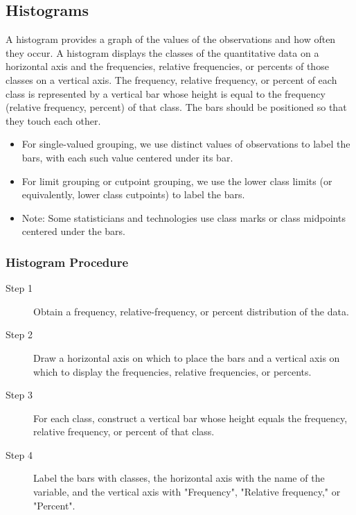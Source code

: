 \documentclass[12pt]{article}
\begin{document}
        \subsection*{Histograms}
            A histogram provides a graph of the values of the observations and how often
            they occur. A histogram displays the classes of the quantitative data on a
            horizontal axis and the frequencies, relative frequencies, or percents of those
            classes on a vertical axis. The frequency, relative frequency, or percent of 
            each class is represented by a vertical bar whose height is equal to the 
            frequency (relative frequency, percent) of that class. The bars should be
            positioned so that they touch each other.
            \begin{itemize}
                \item For single-valued grouping, we use distinct values of observations
                to label the bars, with each such value centered under its bar.
                \item For limit grouping or cutpoint grouping, we use the lower class
                limits (or equivalently, lower class cutpoints) to label the bars. 
                \item Note: Some statisticians and technologies use class marks or class
                midpoints centered under the bars.
            \end{itemize}
            \subsubsection*{Histogram Procedure}
                \begin{description}
                    \item[Step 1] Obtain a frequency, relative-frequency, or percent
                    distribution of the data.
                    \item[Step 2] Draw a horizontal axis on which to place the bars and a
                    vertical axis on which to display the frequencies, relative 
                    frequencies, or percents.
                    \item[Step 3] For each class, construct a vertical bar whose height
                    equals the frequency, relative frequency, or percent of that class.
                    \item[Step 4] Label the bars with classes, the horizontal axis with the
                    name of the variable, and the vertical axis with "Frequency",
                    "Relative frequency," or "Percent".  
                \end{description}
\end{document}

